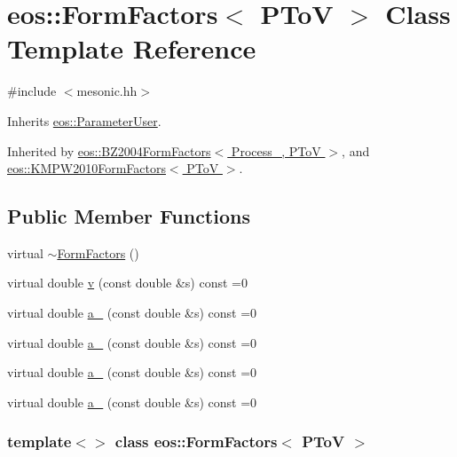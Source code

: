\hypertarget{classeos_1_1FormFactors_3_01PToV_01_4}{
\section{eos::FormFactors$<$ PToV $>$ Class Template Reference}
\label{classeos_1_1FormFactors_3_01PToV_01_4}
}


{\ttfamily \#include $<$mesonic.hh$>$}

Inherits \hyperlink{classeos_1_1ParameterUser}{eos::ParameterUser}.

Inherited by \hyperlink{classeos_1_1BZ2004FormFactors_3_01Process___00_01PToV_01_4}{eos::BZ2004FormFactors$<$ Process\_\-, PToV $>$}, and \hyperlink{classeos_1_1KMPW2010FormFactors_3_01PToV_01_4}{eos::KMPW2010FormFactors$<$ PToV $>$}.\subsection*{Public Member Functions}
\begin{DoxyCompactItemize}
\item 
virtual \hyperlink{classeos_1_1FormFactors_3_01PToV_01_4_ad5af6b693cab6af9a9e5804165b9f465}{$\sim$FormFactors} ()
\item 
virtual double \hyperlink{classeos_1_1FormFactors_3_01PToV_01_4_a1a76e6a00b424994b0b4eb86b4a8131f}{v} (const double \&s) const =0
\item 
virtual double \hyperlink{classeos_1_1FormFactors_3_01PToV_01_4_ac1f21721a19b71abb3e3a433793db159}{a\_} (const double \&s) const =0
\item 
virtual double \hyperlink{classeos_1_1FormFactors_3_01PToV_01_4_a0d6fdeca880da81163bbcdca7057bdcb}{a\_} (const double \&s) const =0
\item 
virtual double \hyperlink{classeos_1_1FormFactors_3_01PToV_01_4_adf8b5d0a879693460aa67feec257c959}{a\_} (const double \&s) const =0
\item 
virtual double \hyperlink{classeos_1_1FormFactors_3_01PToV_01_4_aba4400dbd92741ee82eb759c62a28fa9}{a\_} (const double \&s) const =0
\end{DoxyCompactItemize}
\subsubsection*{template$<$$>$ class eos::FormFactors$<$ PToV $>$}



